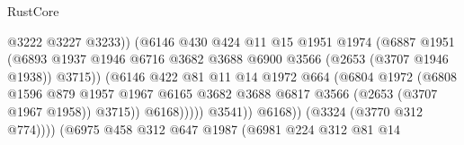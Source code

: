 \begin{lexlean}{RustCore}
\begin{coremodule}
                                          @3222
                                          @3227
                                          @3233))
                                      (@6146
                                        @430
                                        @424
                                        @11
                                        @15
                                        @1951
                                        @1974
                                        (@6887
                                          @1951
                                          (@6893
                                            @1937
                                            @1946
                                            @6716
                                            @3682
                                            @3688
                                            @6900
                                            @3566
                                            (@2653 (@3707 @1946 @1938))
                                            @3715))
                                        (@6146
                                          @422
                                          @81
                                          @11
                                          @14
                                          @1972
                                          @664
                                          (@6804
                                            @1972
                                            (@6808
                                              @1596
                                              @879
                                              @1957
                                              @1967
                                              @6165
                                              @3682
                                              @3688
                                              @6817
                                              @3566
                                              (@2653 (@3707 @1967 @1958))
                                              @3715))
                                          @6168)))))
                                @3541))
                            @6168))
                        (@3324 (@3770 @312 @774))))
                    (@6975
                      @458
                      @312
                      @647
                      @1987
                      (@6981
                        @224
                        @312
                        @81
                        @14

\end{coremodule}
\end{lexlean}
